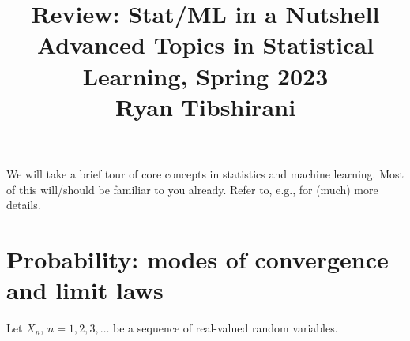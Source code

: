 \documentclass{article}
\title{Review: Stat/ML in a Nutshell \\ \smallskip
\large Advanced Topics in Statistical Learning, Spring 2023 \\ \smallskip
Ryan Tibshirani}
\date{}
\begin{document}
\maketitle
\RaggedRight
\vspace{-50pt}

We will take a brief tour of core concepts in statistics and machine learning. 
Most of this will/should be familiar to you already. Refer to, e.g.,
\citet{wasserman2004all, hastie2009elements} for (much) more details.

\section{Probability: modes of convergence and limit laws}

\def\asto{\overset{\mathrm{as}}{\to}}
\def\pto{\overset{p}{\to}}
\def\dto{\overset{d}{\to}}

Let $X_n$, $n=1,2,3,\dots$ be a sequence of real-valued random variables. 
\end{document}
